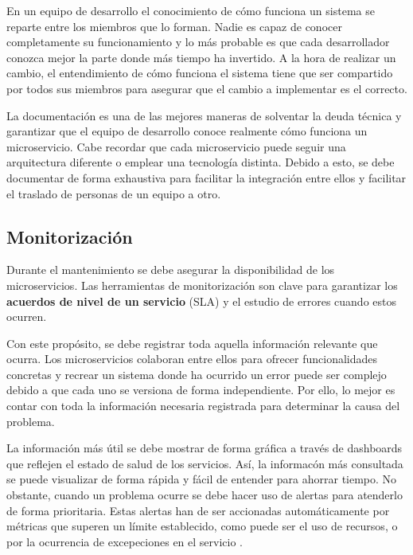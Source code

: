 \documentclass[11pt,spanish,listoffigures]{tfgetsinf}
\begin{document}
En un equipo de desarrollo el conocimiento de cómo funciona un sistema se reparte entre los miembros que lo forman. Nadie es capaz de conocer completamente su funcionamiento y lo más probable es que cada desarrollador conozca mejor la parte donde más tiempo ha invertido. A la hora de realizar un cambio, el entendimiento de cómo funciona el sistema tiene que ser compartido por todos sus miembros para asegurar que el cambio a implementar es el correcto.

La documentación es una de las mejores maneras de solventar la deuda técnica y garantizar que el equipo de desarrollo conoce realmente cómo funciona un microservicio. Cabe recordar que cada microservicio puede seguir una arquitectura diferente o emplear una tecnología distinta. Debido a esto, se debe documentar de forma exhaustiva para facilitar la integración entre ellos y facilitar el traslado de personas de un equipo a otro.

\subsection{Monitorización}

Durante el mantenimiento se debe asegurar la disponibilidad de los microservicios. Las herramientas de monitorización son clave para garantizar los \textbf{acuerdos de nivel de un servicio} (SLA) y el estudio de errores cuando estos ocurren.

Con este propósito, se debe registrar toda aquella información relevante que ocurra. Los microservicios colaboran entre ellos para ofrecer funcionalidades concretas y recrear un sistema donde ha ocurrido un error puede ser complejo debido a que cada uno se versiona de forma independiente. Por ello, lo mejor es contar con toda la información necesaria registrada para determinar la causa del problema.

La información más útil se debe mostrar de forma gráfica a través de dashboards que reflejen el estado de salud de los servicios. Así, la informacón más consultada se puede visualizar de forma rápida y fácil de entender para ahorrar tiempo. No obstante, cuando un problema ocurre se debe hacer uso de alertas para atenderlo de forma prioritaria. Estas alertas han de ser accionadas automáticamente por métricas que superen un límite establecido, como puede ser el uso de recursos, o por la ocurrencia de excepeciones en el servicio \cite{FowlerSusan}. 

%
\end{document}
